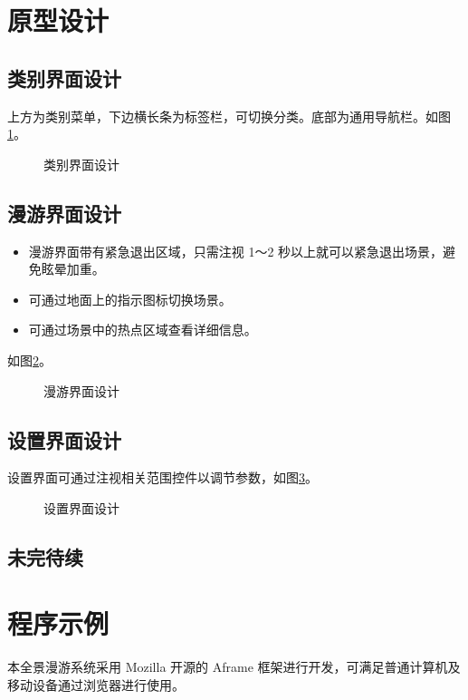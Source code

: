 \section{原型设计}
\subsection{类别界面设计}
上方为类别菜单，下边横长条为标签栏，可切换分类。底部为通用导航栏。如图\ref{fig:menu}。

\begin{figure}[htp]
\centering
{}
\caption{类别界面设计}
\label{fig:menu}
\end{figure}

\subsection{漫游界面设计}
\begin{itemize}
	\item 漫游界面带有紧急退出区域，只需注视 1～2 秒以上就可以紧急退出场景，避免眩晕加重。
	\item 可通过地面上的指示图标切换场景。
	\item 可通过场景中的热点区域查看详细信息。
\end{itemize}
如图\ref{fig:scenery}。

\begin{figure}[htp]
\centering
{}
\caption{漫游界面设计}
\label{fig:scenery}
\end{figure}

\subsection{设置界面设计}
设置界面可通过注视相关范围控件以调节参数，如图\ref{fig:setting}。

\begin{figure}[htp]
\centering
{}
\caption{设置界面设计}
\label{fig:setting}
\end{figure}

\subsection{未完待续}

\section{程序示例}
本全景漫游系统采用 Mozilla 开源的 Aframe 框架进行开发，可满足普通计算机及移动设备通过浏览器进行使用。
